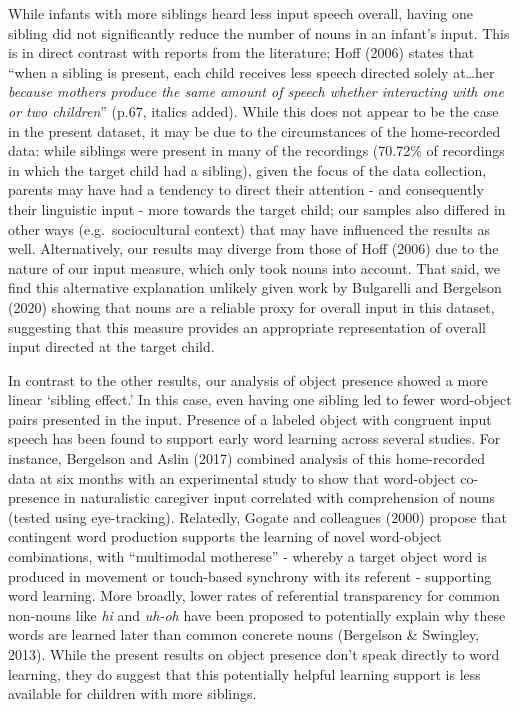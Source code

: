 \documentclass[
  english,
  man,floatsintext]{apa6}
\begin{document}
While infants with more siblings heard less input speech overall, having one sibling did not significantly reduce the number of nouns in an infant's input. This is in direct contrast with reports from the literature; Hoff (2006) states that ``when a sibling is present, each child receives less speech directed solely at\ldots her \emph{because mothers produce the same amount of speech whether interacting with one or two children}'' (p.67, italics added). While this does not appear to be the case in the present dataset, it may be due to the circumstances of the home-recorded data: while siblings were present in many of the recordings (70.72\% of recordings in which the target child had a sibling), given the focus of the data collection, parents may have had a tendency to direct their attention - and consequently their linguistic input - more towards the target child; our samples also differed in other ways (e.g.~sociocultural context) that may have influenced the results as well. Alternatively, our results may diverge from those of Hoff (2006) due to the nature of our input measure, which only took nouns into account. That said, we find this alternative explanation unlikely given work by Bulgarelli and Bergelson (2020) showing that nouns are a reliable proxy for overall input in this dataset, suggesting that this measure provides an appropriate representation of overall input directed at the target child.

In contrast to the other results, our analysis of object presence showed a more linear `sibling effect.' In this case, even having one sibling led to fewer word-object pairs presented in the input. Presence of a labeled object with congruent input speech has been found to support early word learning across several studies. For instance, Bergelson and Aslin (2017) combined analysis of this home-recorded data at six months with an experimental study to show that word-object co-presence in naturalistic caregiver input correlated with comprehension of nouns (tested using eye-tracking). Relatedly, Gogate and colleagues (2000) propose that contingent word production supports the learning of novel word-object combinations, with ``multimodal motherese'' - whereby a target object word is produced in movement or touch-based synchrony with its referent - supporting word learning. More broadly, lower rates of referential transparency for common non-nouns like \emph{hi} and \emph{uh-oh} have been proposed to potentially explain why these words are learned later than common concrete nouns (Bergelson \& Swingley, 2013). While the present results on object presence don't speak directly to word learning, they do suggest that this potentially helpful learning support is less available for children with more siblings.
\end{document}
